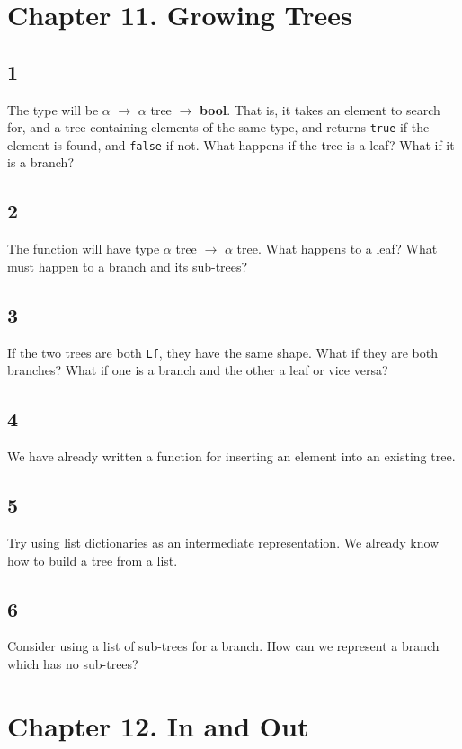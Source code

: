 \documentclass[]{book}
\begin{document}
\section*{Chapter 11. Growing Trees}

\subsection*{1}
The type will be \textsf{$\alpha$ $\rightarrow$ $\alpha$ tree $\rightarrow$ \textbf{bool}}. That is, it takes an element to search for, and a tree containing elements of the same type, and returns \texttt{true} if the element is found, and \texttt{false} if not. What happens if the tree is a leaf? What if it is a branch?

\subsection*{2}
The function will have type \textsf{$\alpha$  tree $\rightarrow$ $\alpha$ tree}. What happens to a leaf? What must happen to a branch and its sub-trees?

\subsection*{3}
If the two trees are both \texttt{Lf}, they have the same shape. What if they are both branches? What if one is a branch and the other a leaf or vice versa? 

\subsection*{4}
We have already written a function for inserting an element into an existing tree.

\subsection*{5}
Try using list dictionaries as an intermediate representation. We already know how to build a tree from a list.

\subsection*{6}
Consider using a list of sub-trees for a branch. How can we represent a branch which has no sub-trees?

\section*{Chapter 12. In and Out}
\end{document}
